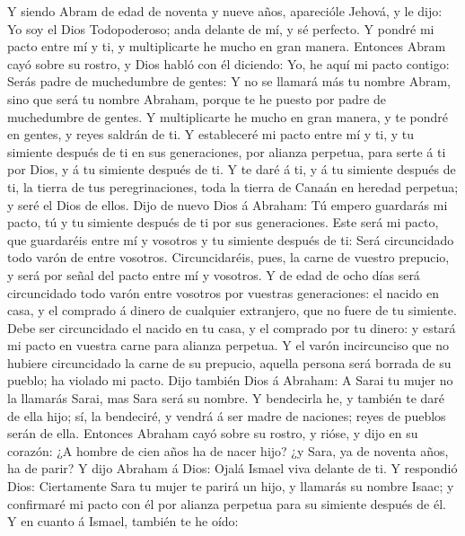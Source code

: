 Y siendo Abram de edad de noventa y nueve años,
aparecióle Jehová, y le dijo: Yo soy el Dios Todopoderoso; anda delante
de mí, y sé perfecto.  Y pondré mi pacto entre mí y ti, y
multiplicarte he mucho en gran manera.  Entonces Abram
cayó sobre su rostro, y Dios habló con él diciendo:  Yo,
he aquí mi pacto contigo: Serás padre de muchedumbre de gentes:
 Y no se llamará más tu nombre Abram, sino que será tu
nombre Abraham, porque te he puesto por padre de muchedumbre de gentes.
 Y multiplicarte he mucho en gran manera, y te pondré en
gentes, y reyes saldrán de ti.  Y estableceré mi pacto
entre mí y ti, y tu simiente después de ti en sus generaciones, por
alianza perpetua, para serte á ti por Dios, y á tu simiente después de
ti.  Y te daré á ti, y á tu simiente después de ti, la
tierra de tus peregrinaciones, toda la tierra de Canaán en heredad
perpetua; y seré el Dios de ellos.  Dijo de nuevo Dios á
Abraham: Tú empero guardarás mi pacto, tú y tu simiente después de ti
por sus generaciones.  Este será mi pacto, que guardaréis
entre mí y vosotros y tu simiente después de ti: Será circuncidado todo
varón de entre vosotros.  Circuncidaréis, pues, la carne
de vuestro prepucio, y será por señal del pacto entre mí y vosotros.
 Y de edad de ocho días será circuncidado todo varón
entre vosotros por vuestras generaciones: el nacido en casa, y el
comprado á dinero de cualquier extranjero, que no fuere de tu simiente.
 Debe ser circuncidado el nacido en tu casa, y el
comprado por tu dinero: y estará mi pacto en vuestra carne para alianza
perpetua.  Y el varón incircunciso que no hubiere
circuncidado la carne de su prepucio, aquella persona será borrada de su
pueblo; ha violado mi pacto.  Dijo también Dios á
Abraham: A Sarai tu mujer no la llamarás Sarai, mas Sara será su nombre.
 Y bendecirla he, y también te daré de ella hijo; sí, la
bendeciré, y vendrá á ser madre de naciones; reyes de pueblos serán de
ella.  Entonces Abraham cayó sobre su rostro, y rióse, y
dijo en su corazón: ¿A hombre de cien años ha de nacer hijo? ¿y Sara, ya
de noventa años, ha de parir?  Y dijo Abraham á Dios:
Ojalá Ismael viva delante de ti.  Y respondió Dios:
Ciertamente Sara tu mujer te parirá un hijo, y llamarás su nombre Isaac;
y confirmaré mi pacto con él por alianza perpetua para su simiente
después de él.  Y en cuanto á Ismael, también te he oído:
